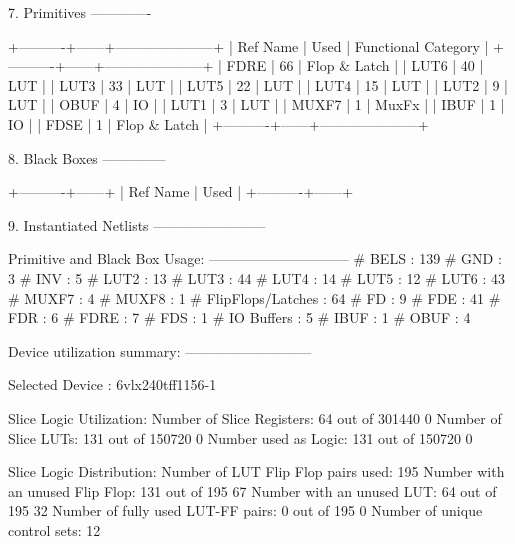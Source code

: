 \documentclass{article}
\begin{document}
7. Primitives
-------------

+----------+------+---------------------+
| Ref Name | Used | Functional Category |
+----------+------+---------------------+
| FDRE     |   66 |        Flop & Latch |
| LUT6     |   40 |                 LUT |
| LUT3     |   33 |                 LUT |
| LUT5     |   22 |                 LUT |
| LUT4     |   15 |                 LUT |
| LUT2     |    9 |                 LUT |
| OBUF     |    4 |                  IO |
| LUT1     |    3 |                 LUT |
| MUXF7    |    1 |               MuxFx |
| IBUF     |    1 |                  IO |
| FDSE     |    1 |        Flop & Latch |
+----------+------+---------------------+


8. Black Boxes
--------------

+----------+------+
| Ref Name | Used |
+----------+------+


9. Instantiated Netlists
------------------------

\fi
\iffalse
Primitive and Black Box Usage:
------------------------------
# BELS                             : 139
#      GND                         : 3
#      INV                         : 5
#      LUT2                        : 13
#      LUT3                        : 44
#      LUT4                        : 14
#      LUT5                        : 12
#      LUT6                        : 43
#      MUXF7                       : 4
#      MUXF8                       : 1
# FlipFlops/Latches                : 64
#      FD                          : 9
#      FDE                         : 41
#      FDR                         : 6
#      FDRE                        : 7
#      FDS                         : 1
# IO Buffers                       : 5
#      IBUF                        : 1
#      OBUF                        : 4

Device utilization summary:
---------------------------

Selected Device : 6vlx240tff1156-1 


Slice Logic Utilization: 
 Number of Slice Registers:              64  out of  301440     0%
 Number of Slice LUTs:                  131  out of  150720     0%
    Number used as Logic:               131  out of  150720     0%

Slice Logic Distribution: 
 Number of LUT Flip Flop pairs used:    195
   Number with an unused Flip Flop:     131  out of    195    67%
   Number with an unused LUT:            64  out of    195    32%
   Number of fully used LUT-FF pairs:     0  out of    195     0%
   Number of unique control sets:        12
\end{document}
